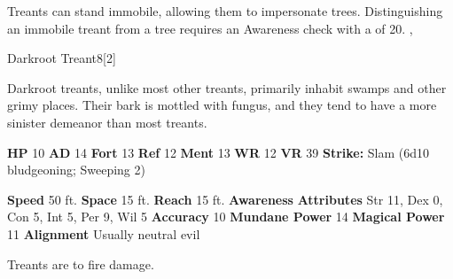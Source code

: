         Treants can stand immobile, allowing them to impersonate trees.
        Distinguishing an immobile treant from a tree requires an Awareness check with a  of 20.
  ,
  \begin{monsubsection}{Darkroot Treant}{8}[2]
    \vspace{-1em}\vspace{-1em}
    \vspace{0em}

    
        Darkroot treants, unlike most other treants, primarily inhabit swamps and other grimy places.
        Their bark is mottled with fungus, and they tend to have a more sinister demeanor than most treants.
      
    

    \begin{spellcontent}
      \begin{spelltargetinginfo}
        \pari \textbf{HP} 10 \monsep
          \textbf{AD} 14 \monsep
          \textbf{Fort} 13 \monsep
          \textbf{Ref} 12 \monsep
          \textbf{Ment} 13
        \pari \textbf{WR} 12 \monsep
        \textbf{VR} 39
        \pari \textbf{Strike:}
            Slam  (6d10 bludgeoning; Sweeping 2)
      \end{spelltargetinginfo}
    \end{spellcontent}
    \begin{monsterfooter}
      \pari \textbf{Speed} 50 ft. \monsep
        \textbf{Space} 15 ft. \monsep
        \textbf{Reach} 15 ft.
      \pari \textbf{Awareness} 
      \pari \textbf{Attributes}
        Str 11, Dex 0,
        Con 5, Int 5,
        Per 9, Wil 5
      \pari \textbf{Accuracy} 10 \monsep
        \textbf{Mundane Power} 14 \monsep
      \textbf{Magical Power} 11
      \pari \textbf{Alignment} Usually neutral evil
    \end{monsterfooter}
  \end{monsubsection}
        Treants are  to fire damage.
      
